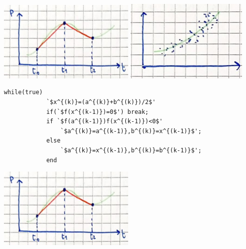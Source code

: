 \begin{center}
    \includegraphics[width=0.5\textwidth]{images/intro_interpolation.png}
    \includegraphics[width=0.45\textwidth]{images/intro_leastsquare.png}
\end{center}

\begin{center}
    \begin{lstlisting}[escapeinside=`']
        while(true)
            `$x^{(k)}=(a^{(k)}+b^{(k)})/2$'
            if(`$f(x^{(k-1)})=0$') break;
            if `$f(a^{(k-1)})f(x^{(k-1)})<0$'
                `$a^{(k)}=a^{(k-1)},b^{(k)}=x^{(k-1)}$';
            else
                `$a^{(k)}=x^{(k-1)},b^{(k)}=b^{(k-1)}$';
            end
        \end{lstlisting}
\end{center}
\begin{center}
    \includegraphics[width=0.5\textwidth]{images/intro_interpolation.png}
\end{center}
